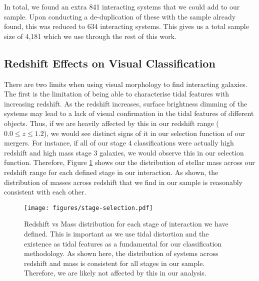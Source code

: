 \documentclass[fleqn,usenatbib]{mnras}
\begin{document}
In total, we found an extra 841 interacting systems that we could add to our sample. Upon conducting a de-duplication of these with the sample already found, this was reduced to 634 interacting systems. This gives us a total sample size of 4,181 which we use through the rest of this work.

\subsection{Redshift Effects on Visual Classification}
\noindent There are two limits when using visual morphology to find interacting galaxies. The first is the limitation of being able to characterise tidal features with increasing redshift. As the redshift increases, surface brightness dimming of the systems may lead to a lack of visual confirmation in the tidal features of different objects. Thus, if we are heavily affected by this in our redshift range ($0.0 \leq z \leq 1.2$), we would see distinct signs of it in our selection function of our mergers. For instance, if all of our stage 4 classifications were actually high redshift and high mass stage 3 galaxies, we would observe this in our selection function. Therefore, Figure \ref{fig:redshift_selection} shows our the distribution of stellar mass across our redshift range for each defined stage in our interaction. As shown, the distribution of masses across redshift that we find in our sample is reasonably consistent with each other.

\begin{figure}
    \centering
    \texttt{[image: figures/stage-selection.pdf]}
    \caption{Redshift vs Mass distribution for each stage of interaction we have defined. This is important as we use tidal distortion and the existence as tidal features as a fundamental for our classification methodology. As shown here, the distribution of systems across redshift and mass is consistent for all stages in our sample. Therefore, we are likely not affected by this in our analysis.}
    \label{fig:redshift_selection}
\end{figure}
\end{document}
